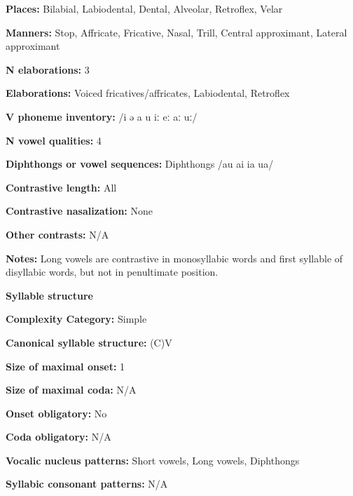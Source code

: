 \textbf{Places:} Bilabial, Labiodental, Dental, Alveolar, Retroflex, Velar



\textbf{Manners:} Stop, Affricate, Fricative, Nasal, Trill, Central approximant, Lateral approximant



\textbf{N elaborations:} 3



\textbf{Elaborations:} Voiced fricatives/affricates, Labiodental, Retroflex



\textbf{V phoneme inventory:} /i ə a u iː eː aː uː/



\textbf{N vowel qualities:} 4



\textbf{Diphthongs or vowel sequences:} Diphthongs /au ai ia ua/



\textbf{Contrastive length:} All



\textbf{Contrastive nasalization:} None



\textbf{Other contrasts:} N/A



\textbf{Notes:} Long vowels are contrastive in monosyllabic words and first syllable of disyllabic words, but not in penultimate position.



\textbf{Syllable structure}



\textbf{Complexity Category:} Simple



\textbf{Canonical syllable structure:} (C)V \citep[211-18]{Chen2006}



\textbf{Size of maximal onset:} 1



\textbf{Size of maximal coda:} N/A



\textbf{Onset obligatory:} No



\textbf{Coda obligatory:} N/A



\textbf{Vocalic nucleus patterns:} Short vowels, Long vowels, Diphthongs



\textbf{Syllabic consonant patterns:} N/A




